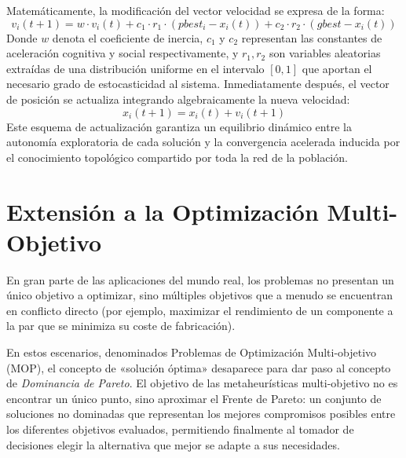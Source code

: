\documentclass[12pt,a4paper,twoside,openright]{book}
\begin{document}
    Matemáticamente, la modificación del vector velocidad se expresa de la forma:
    \begin{equation}
    v_i(t+1) = w \cdot v_i(t) + c_1 \cdot r_1 \cdot (pbest_i - x_i(t)) + c_2 \cdot r_2 \cdot (gbest - x_i(t))
    \end{equation}
    Donde $w$ denota el coeficiente de inercia, $c_1$ y $c_2$ representan las constantes de aceleración cognitiva y social respectivamente, y $r_1, r_2$ son variables aleatorias extraídas de una distribución uniforme en el intervalo $[0, 1]$ que aportan el necesario grado de estocasticidad al sistema. Inmediatamente después, el vector de posición se actualiza integrando algebraicamente la nueva velocidad:
    \begin{equation}
    x_i(t+1) = x_i(t) + v_i(t+1)
    \end{equation}
    Este esquema de actualización garantiza un equilibrio dinámico entre la autonomía exploratoria de cada solución y la convergencia acelerada inducida por el conocimiento topológico compartido por toda la red de la población.


\section{Extensión a la Optimización Multi-Objetivo}

    En gran parte de las aplicaciones del mundo real, los problemas no presentan un único objetivo a optimizar, sino múltiples objetivos que a menudo se encuentran en conflicto directo (por ejemplo, maximizar el rendimiento de un componente a la par que se minimiza su coste de fabricación).
    
    En estos escenarios, denominados Problemas de Optimización Multi-objetivo (MOP), el concepto de «solución óptima» desaparece para dar paso al concepto de \textit{Dominancia de Pareto}. El objetivo de las metaheurísticas multi-objetivo no es encontrar un único punto, sino aproximar el Frente de Pareto: un conjunto de soluciones no dominadas que representan los mejores compromisos posibles entre los diferentes objetivos evaluados, permitiendo finalmente al tomador de decisiones elegir la alternativa que mejor se adapte a sus necesidades.
\end{document}
